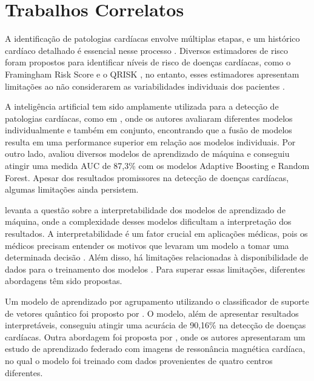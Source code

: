 \section{Trabalhos Correlatos}

A identificação de patologias cardíacas envolve múltiplas etapas, e um histórico cardíaco detalhado é essencial nesse processo \cite{malik2023cardiac}. Diversos estimadores de risco foram propostos para identificar níveis de risco de doenças cardíacas, como o Framingham Risk Score \cite{hemann2007framingham} e o QRISK \cite{hippisley2007derivation}, no entanto, esses estimadores apresentam limitações ao não considerarem as variabilidades individuais dos pacientes \cite{talha_major_2024}.

A inteligência artificial tem sido amplamente utilizada para a detecção de patologias cardíacas, como em \cite{subramani_cardiovascular_2023}, onde os autores avaliaram diferentes modelos individualmente e também em conjunto, encontrando que a fusão de modelos resulta em uma performance superior em relação aos modelos individuais. Por outro lado, \cite{dahia_implementing_2023} avaliou diversos modelos de aprendizado de máquina e conseguiu atingir uma medida AUC de 87,3\% com os modelos Adaptive Boosting e Random Forest. Apesar dos resultados promissores na detecção de doenças cardíacas, algumas limitações ainda persistem.

\cite{chakraborty2017interpretability} levanta a questão sobre a interpretabilidade dos modelos de aprendizado de máquina, onde a complexidade desses modelos dificultam a interpretação dos resultados. A interpretabilidade é um fator crucial em aplicações médicas, pois os médicos precisam entender os motivos que levaram um modelo a tomar uma determinada decisão \cite{stiglic2020interpretability}. Além disso, há limitações relacionadas à disponibilidade de dados para o treinamento dos modelos \cite{fardouly2022potential}. Para superar essas limitações, diferentes abordagens têm sido propostas.

Um modelo de aprendizado por agrupamento utilizando o classificador de suporte de vetores quântico foi proposto por \cite{abdulsalam2023explainable}. O modelo, além de apresentar resultados interpretáveis, conseguiu atingir uma acurácia de 90,16\% na detecção de doenças cardíacas. Outra abordagem foi proposta por \cite{linardos2022federated}, onde os autores apresentaram um estudo de aprendizado federado com imagens de ressonância magnética cardíaca, no qual o modelo foi treinado com dados provenientes de quatro centros diferentes.
